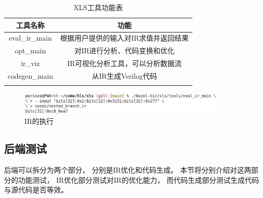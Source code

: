 \begin{table}[ht]
\begin{center}
\caption{XLS工具功能表}

\begin{tabular}{ c c }
    \Xhline{3\arrayrulewidth}
    工具名称              & 功能 \\
    \hline
    eval\_ir\_main       & 根据用户提供的输入对IR求值并返回结果 \\
    opt\_main            & 对IR进行分析、代码变换和优化 \\
    ir\_viz              & IR可视化分析工具，可以分析数据流 \\
    codegen\_main        & 从IR生成Verilog代码 \\
    \Xhline{3\arrayrulewidth}
\end{tabular}

\label{table.5}
\end{center}
\end{table}

\begin{figure}[h]
\centering
\includegraphics[width=0.9\textwidth]{figure/eval_ir_command.png}
\caption{IR的执行}
\label{fig.6}
\end{figure}

\subsection{后端测试}



后端可以拆分为两个部分，
分别是IR优化和代码生成。
本节将分别介绍对这两部分的功能测试，
IR优化部分测试对IR的优化能力，
而代码生成部分测试生成代码与源代码是否等效。

